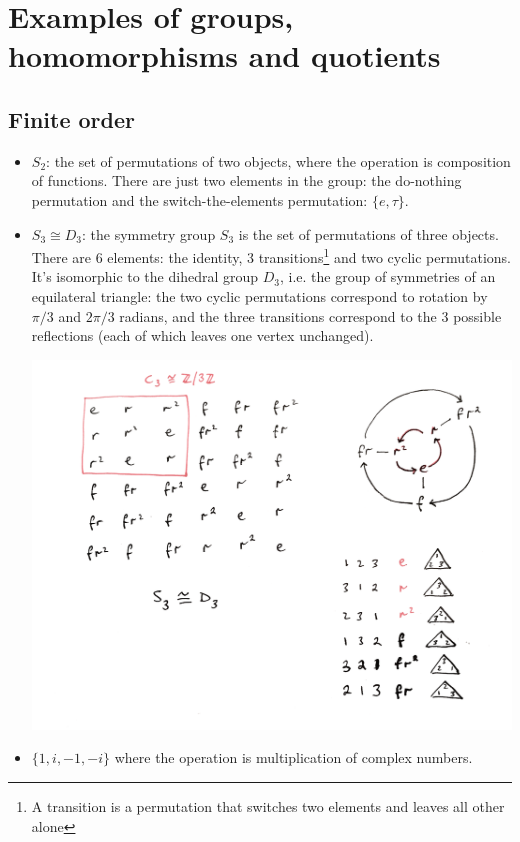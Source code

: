 \section{Examples of groups, homomorphisms and quotients}

\subsection{Finite order}

\begin{itemize}
\item $S_2$: the set of permutations of two objects, where the operation is
  composition of functions.  There are just two elements in the group: the
  do-nothing permutation and the switch-the-elements permutation: $\{e,
  \tau\}$.

\item $S_3 \cong D_3$: the symmetry group $S_3$ is the set of permutations of three objects. There
  are 6 elements: the identity, 3 transitions\footnote{A transition is a permutation that switches
    two elements and leaves all other alone} and two cyclic permutations. It's isomorphic to the
  dihedral group $D_3$, i.e. the group of symmetries of an equilateral triangle: the two cyclic
  permutations correspond to rotation by $\pi/3$ and $2\pi/3$ radians, and the three transitions
  correspond to the 3 possible reflections (each of which leaves one vertex unchanged).
  \begin{mdframed}
    \includegraphics[width=400pt]{img/abstract-algebra-s3-d3.png}
  \end{mdframed}
\item $\{1, i, -1, -i\}$ where the operation is multiplication of complex numbers.
\end{itemize}

